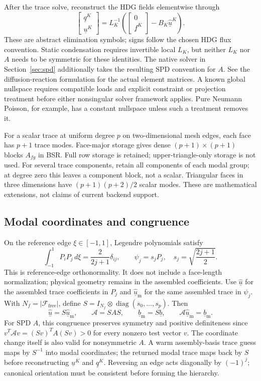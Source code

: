 \documentclass[11pt]{article}
\numberwithin{equation}{section}
\numberwithin{figure}{section}
\numberwithin{table}{section}
\begin{document}
After the trace solve, reconstruct the HDG fields elementwise through
\[
 \begin{bmatrix}\underline{q}^K\\\underline{u}^K\end{bmatrix}
 =L_K^{-1}\left(
 \begin{bmatrix}0\\\underline{f}^K\end{bmatrix}
 -B_K\underline{\widehat{u}}^K\right).
\]
These are abstract elimination symbols; signs follow the chosen HDG flux
convention. Static condensation requires invertible local $L_K$, but neither
$L_K$ nor $A$ needs to be symmetric for these identities. The native solver
in Section~\ref{sec:spd} additionally takes the resulting SPD convention for $A$.
See the diffusion-reaction formulation for the actual element matrices.
A known global nullspace requires compatible loads and explicit constraint or
projection treatment before either nonsingular solver framework applies.
Pure Neumann Poisson, for example, has a constant nullspace unless such a
treatment removes it.

For a scalar trace at uniform degree $p$ on two-dimensional mesh edges,
each face has $p+1$ trace modes. Face-major storage gives dense $(p+1)\times(p+1)$ blocks $A_{fg}$
in BSR. Full row storage is retained; upper-triangle-only storage is not used.
For several trace components, retain all components of each modal group;
at degree zero this leaves a component block, not a scalar.
Triangular faces in three dimensions have $(p+1)(p+2)/2$ scalar modes.
These are mathematical extensions, not claims of current backend support.

\subsection{Modal coordinates and congruence}\label{sec:coordinates}
On the reference edge $\xi\in[-1,1]$, Legendre polynomials satisfy
\[
 \int_{-1}^1 P_iP_j\,d\xi=\frac{2}{2j+1}\delta_{ij},\qquad
 \psi_j=s_jP_j,\quad s_j=\sqrt{\frac{2j+1}{2}}.
\]
This is reference-edge orthonormality. It does not include a face-length
normalization; physical geometry remains in the assembled coefficients.
Use $\underline{\widehat{u}}$ for the assembled trace coefficients in $P_j$
and $\underline{\widehat{u}}_{\mathrm{m}}$ for the same assembled trace in
$\psi_j$. With $N_f=|\mathcal F_{\mathrm{free}}|$, define
$S=I_{N_f}\otimes\operatorname{diag}(s_0,\ldots,s_p)$. Then
\[
 \underline{\widehat{u}}=S\underline{\widehat{u}}_{\mathrm{m}},
 \qquad \mathcal A=SAS,\qquad
 \underline{b}_{\mathrm{m}}=S\underline{b},\qquad
 \mathcal A\underline{\widehat{u}}_{\mathrm{m}}
 =\underline{b}_{\mathrm{m}}.
\]
For SPD $A$, this congruence preserves symmetry and positive definiteness since
$v^T\mathcal A v=(Sv)^TA(Sv)>0$ for every nonzero test vector $v$.
The coordinate change itself is also valid for nonsymmetric $A$.
A warm assembly-basis trace guess maps by $S^{-1}$ into modal coordinates;
the returned modal trace maps back by $S$ before reconstructing
$\underline{u}^K$ and $\underline{q}^K$.
Reversing an edge acts diagonally by $(-1)^j$;
canonical orientation must be consistent before forming the hierarchy.
\end{document}
